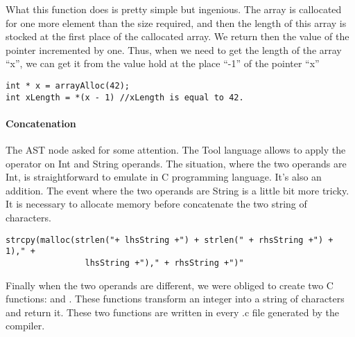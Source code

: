 What this function does is pretty simple but ingenious. The array is callocated for one more element than the size required, and then the length of this array is stocked at the first place of the callocated array. We return then the value of the pointer incremented by one. Thus, when we need to get the length of the array ``x'', we can get it from the value hold at the place ``-1'' of the pointer ``x''

\begin{lstlisting}
int * x = arrayAlloc(42);
int xLength = *(x - 1) //xLength is equal to 42.
\end{lstlisting}

\paragraph{Concatenation}
The AST node  asked for some attention.
The Tool language allows to apply the \say{+} operator on Int and String operands.
\newline
The situation, where the two operands are Int, is straightforward to emulate in C programming language.
It's also an addition.
\newline
The event where the two operands are String is a little bit more tricky.
It is necessary to allocate memory before concatenate the two string of characters.
\begin{lstlisting}
strcpy(malloc(strlen("+ lhsString +") + strlen(" + rhsString +") + 1)," +
                lhsString +")," + rhsString +")"
\end{lstlisting}
Finally when the two operands are different, we were obliged to create two C functions:
\newline
\lstset{style=customc}{\lstinline[basicstyle=\small\ttfamily]|void helper_reverse_plus(char str[], int len)|} and
\lstset{style=customc}{\lstinline[basicstyle=\small\ttfamily]|char* itoa(int num)|}.
These functions transform an integer into a string of characters and return it.
\newline
These two functions are written in every .c file generated by the compiler.
\newline
